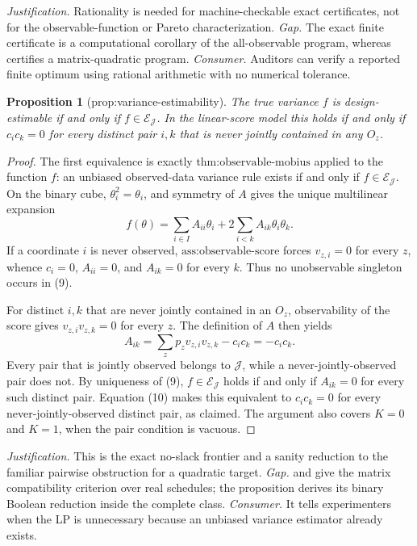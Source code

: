 \documentclass{article}
\newtheorem{proposition}{Proposition}
\begin{document}
\par\smallskip\noindent \textit{Justification.} Rationality is needed for machine-checkable exact certificates, not for the observable-function or Pareto characterization. \textit{Gap.} The exact finite certificate is a computational corollary of the all-observable program, whereas \cite{HarshawMiddletonSavje2026} certifies a matrix-quadratic program. \textit{Consumer.} Auditors can verify a reported finite optimum using rational arithmetic with no numerical tolerance.

\begin{proposition}[prop:variance-estimability]\label{prop:variance-estimability}
The true variance \(f\) is design-estimable if and only if \(f\in\mathcal E_{\mathcal J}\). In the linear-score model this holds if and only if \(c_ic_k=0\) for every distinct pair \(i,k\) that is never jointly contained in any \(O_z\).
\end{proposition}
\begin{proof}
The first equivalence is exactly \(\text{thm:observable-mobius}\) applied to the function \(f\): an unbiased observed-data variance rule exists if and only if \(f\in\mathcal E_{\mathcal J}\).  On the binary cube, \(\theta_i^2=\theta_i\), and symmetry of \(A\) gives the unique multilinear expansion
\[
 f(\theta)=\sum_{i\in I}A_{ii}\theta_i
       +2\sum_{i<k}A_{ik}\theta_i\theta_k. \tag{9}
\]
If a coordinate \(i\) is never observed, \(\text{ass:observable-score}\) forces \(v_{z,i}=0\) for every \(z\), whence \(c_i=0\), \(A_{ii}=0\), and \(A_{ik}=0\) for every \(k\).  Thus no unobservable singleton occurs in (9).

For distinct \(i,k\) that are never jointly contained in an \(O_z\), observability of the score gives \(v_{z,i}v_{z,k}=0\) for every \(z\).  The definition of \(A\) then yields
\[
 A_{ik}=\sum_zp_zv_{z,i}v_{z,k}-c_ic_k=-c_ic_k. \tag{10}
\]
Every pair that is jointly observed belongs to \(\mathcal J\), while a never-jointly-observed pair does not.  By uniqueness of (9), \(f\in\mathcal E_{\mathcal J}\) holds if and only if \(A_{ik}=0\) for every such distinct pair.  Equation (10) makes this equivalent to \(c_ic_k=0\) for every never-jointly-observed distinct pair, as claimed.  The argument also covers \(K=0\) and \(K=1\), when the pair condition is vacuous.
\end{proof}
\par\smallskip\noindent \textit{Justification.} This is the exact no-slack frontier and a sanity reduction to the familiar pairwise obstruction for a quadratic target. \textit{Gap.} \cite{Middleton2021Unifying} and \cite{HarshawMiddletonSavje2026} give the matrix compatibility criterion over real schedules; the proposition derives its binary Boolean reduction inside the complete class. \textit{Consumer.} It tells experimenters when the LP is unnecessary because an unbiased variance estimator already exists.
\end{document}
